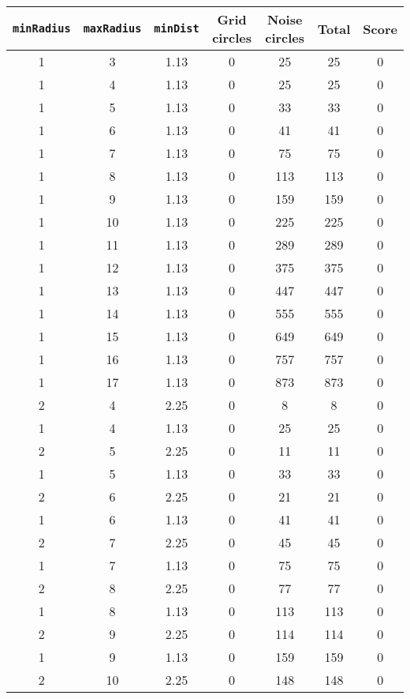 \documentclass[letterpaper, 12pt]{article}
\begin{document}
\begin{longtable}{|c|c|c|c|c|c|c|}
\hline
\textbf{\texttt{minRadius}} & \textbf{\texttt{maxRadius}} & \textbf{\texttt{minDist}} & \textbf{Grid circles} & \textbf{Noise circles} & \textbf{Total} & \textbf{Score} \\
\hline
1 & 3 & 1.13 & 0 & 25 & 25 & 0 \\
\hline
1 & 4 & 1.13 & 0 & 25 & 25 & 0 \\
\hline
1 & 5 & 1.13 & 0 & 33 & 33 & 0 \\
\hline
1 & 6 & 1.13 & 0 & 41 & 41 & 0 \\
\hline
1 & 7 & 1.13 & 0 & 75 & 75 & 0 \\
\hline
1 & 8 & 1.13 & 0 & 113 & 113 & 0 \\
\hline
1 & 9 & 1.13 & 0 & 159 & 159 & 0 \\
\hline
1 & 10 & 1.13 & 0 & 225 & 225 & 0 \\
\hline
1 & 11 & 1.13 & 0 & 289 & 289 & 0 \\
\hline
1 & 12 & 1.13 & 0 & 375 & 375 & 0 \\
\hline
1 & 13 & 1.13 & 0 & 447 & 447 & 0 \\
\hline
1 & 14 & 1.13 & 0 & 555 & 555 & 0 \\
\hline
1 & 15 & 1.13 & 0 & 649 & 649 & 0 \\
\hline
1 & 16 & 1.13 & 0 & 757 & 757 & 0 \\
\hline
1 & 17 & 1.13 & 0 & 873 & 873 & 0 \\
\hline
2 & 4 & 2.25 & 0 & 8 & 8 & 0 \\
\hline
1 & 4 & 1.13 & 0 & 25 & 25 & 0 \\
\hline
2 & 5 & 2.25 & 0 & 11 & 11 & 0 \\
\hline
1 & 5 & 1.13 & 0 & 33 & 33 & 0 \\
\hline
2 & 6 & 2.25 & 0 & 21 & 21 & 0 \\
\hline
1 & 6 & 1.13 & 0 & 41 & 41 & 0 \\
\hline
2 & 7 & 2.25 & 0 & 45 & 45 & 0 \\
\hline
1 & 7 & 1.13 & 0 & 75 & 75 & 0 \\
\hline
2 & 8 & 2.25 & 0 & 77 & 77 & 0 \\
\hline
1 & 8 & 1.13 & 0 & 113 & 113 & 0 \\
\hline
2 & 9 & 2.25 & 0 & 114 & 114 & 0 \\
\hline
1 & 9 & 1.13 & 0 & 159 & 159 & 0 \\
\hline
2 & 10 & 2.25 & 0 & 148 & 148 & 0 \\
\hline

\end{longtable}
\end{document}
